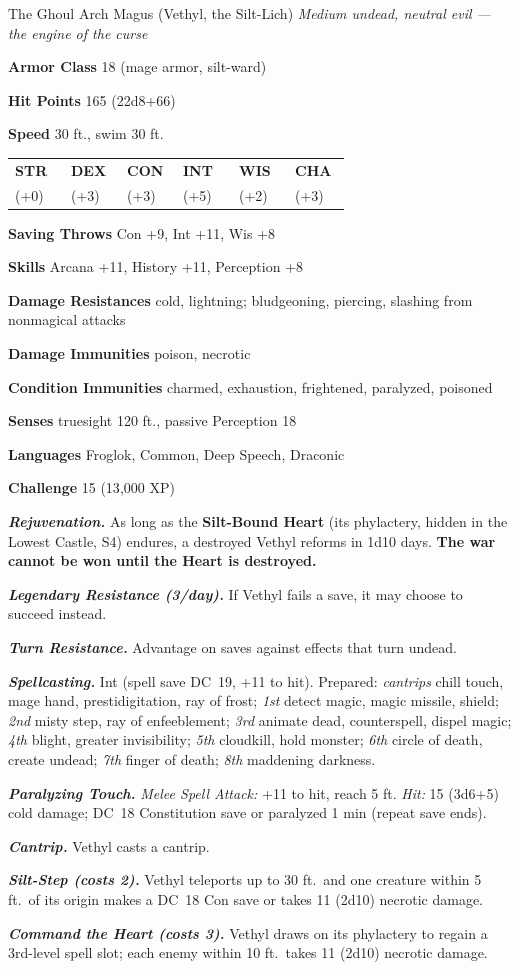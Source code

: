\documentclass[10pt,twoside]{report}
\makeatletter
\newcommand{\msub}[1]{{\itshape #1}\par}
\newcommand{\mrule}{\par\vspace{2pt}{\color{gukred}\rule{\linewidth}{1.1pt}}\par\vspace{2pt}}
\newcommand{\mthin}{\par\vspace{1pt}{\color{gukred!60}\rule{\linewidth}{0.5pt}}\par\vspace{2pt}}
\newcommand{\mfield}[2]{\noindent\textbf{\color{gukred}#1} #2\par}
\newcommand{\mhead}[1]{\par\smallskip{\sffamily\bfseries\scshape\color{gukred}#1}\par
  \vspace{-3pt}{\color{gukred}\rule{\linewidth}{0.7pt}}\par\vspace{2pt}}
\newcommand{\mtrait}[2]{\noindent\textbf{\itshape #1} #2\par\vspace{2pt}}
\newcommand{\abilities}[6]{\par\smallskip\noindent
  {\setlength{\tabcolsep}{1.5pt}%
  \begin{tabular}{@{}*{6}{p{0.15\linewidth}}@{}}
  \centering\sffamily\bfseries\color{gukred}STR &\centering\sffamily\bfseries\color{gukred}DEX
  &\centering\sffamily\bfseries\color{gukred}CON &\centering\sffamily\bfseries\color{gukred}INT
  &\centering\sffamily\bfseries\color{gukred}WIS &\centering\arraybackslash\sffamily\bfseries\color{gukred}CHA\\
  \centering #1 &\centering #2 &\centering #3 &\centering #4 &\centering #5 &\centering\arraybackslash #6\\
  \end{tabular}}\par\smallskip}
\newcommand{\dc}[1]{DC~#1}
\makeatother
\begin{document}
\begin{statblock}{The Ghoul Arch Magus (Vethyl, the Silt-Lich)}
\msub{Medium undead, neutral evil --- \textnormal{the engine of the curse}}
\mrule
\mfield{Armor Class}{18 (mage armor, silt-ward)}
\mfield{Hit Points}{165 (22d8+66)}
\mfield{Speed}{30 ft., swim 30 ft.}
\abilities{11 (+0)}{16 (+3)}{16 (+3)}{21 (+5)}{15 (+2)}{16 (+3)}
\mthin
\mfield{Saving Throws}{Con +9, Int +11, Wis +8}
\mfield{Skills}{Arcana +11, History +11, Perception +8}
\mfield{Damage Resistances}{cold, lightning; bludgeoning, piercing, slashing from nonmagical attacks}
\mfield{Damage Immunities}{poison, necrotic}
\mfield{Condition Immunities}{charmed, exhaustion, frightened, paralyzed, poisoned}
\mfield{Senses}{truesight 120 ft., passive Perception 18}
\mfield{Languages}{Froglok, Common, Deep Speech, Draconic}
\mfield{Challenge}{15 (13{,}000 XP)}
\mrule
\mtrait{Rejuvenation.}{As long as the \textbf{Silt-Bound Heart} (its phylactery, hidden in the Lowest Castle, S4) endures, a destroyed Vethyl reforms in 1d10 days. \textbf{The war cannot be won until the Heart is destroyed.}}
\mtrait{Legendary Resistance (3/day).}{If Vethyl fails a save, it may choose to succeed instead.}
\mtrait{Turn Resistance.}{Advantage on saves against effects that turn undead.}
\mtrait{Spellcasting.}{Int (spell save \dc{19}, +11 to hit). Prepared: \textit{cantrips} chill touch, mage hand, prestidigitation, ray of frost; \textit{1st} detect magic, magic missile, shield; \textit{2nd} misty step, ray of enfeeblement; \textit{3rd} animate dead, counterspell, dispel magic; \textit{4th} blight, greater invisibility; \textit{5th} cloudkill, hold monster; \textit{6th} circle of death, create undead; \textit{7th} finger of death; \textit{8th} maddening darkness.}
\mhead{Actions}
\mtrait{Paralyzing Touch.}{\textit{Melee Spell Attack:} +11 to hit, reach 5 ft. \textit{Hit:} 15 (3d6+5) cold damage; \dc{18} Constitution save or paralyzed 1 min (repeat save ends).}
\mhead{Legendary Actions (3/round)}
\mtrait{Cantrip.}{Vethyl casts a cantrip.}
\mtrait{Silt-Step (costs 2).}{Vethyl teleports up to 30 ft.\ and one creature within 5 ft.\ of its origin makes a \dc{18} Con save or takes 11 (2d10) necrotic damage.}
\mtrait{Command the Heart (costs 3).}{Vethyl draws on its phylactery to regain a 3rd-level spell slot; each enemy within 10 ft.\ takes 11 (2d10) necrotic damage.}
\end{statblock}
\end{document}
